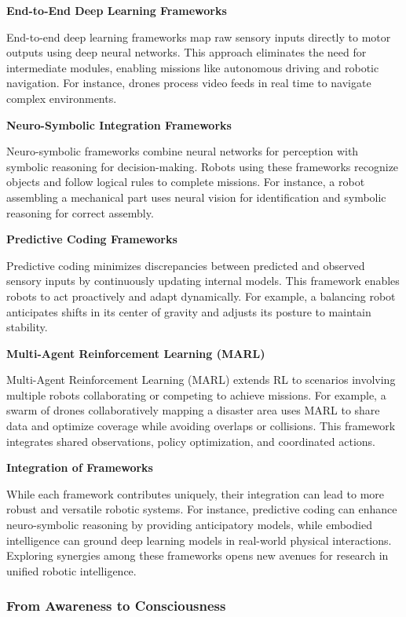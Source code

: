 \documentclass{book}
\providecommand{\ProjectDeepHeading}[2]{%
    \par\medskip\noindent\textbf{#2}\par\smallskip
}
\begin{document}
    \ProjectDeepHeading{4}{End-to-End Deep Learning Frameworks}
    End-to-end deep learning frameworks map raw sensory inputs directly to motor outputs using deep neural networks. This approach eliminates the need for intermediate modules, enabling missions like autonomous driving and robotic navigation. For instance, drones process video feeds in real time to navigate complex environments.

    \ProjectDeepHeading{4}{Neuro-Symbolic Integration Frameworks}
    Neuro-symbolic frameworks combine neural networks for perception with symbolic reasoning for decision-making. Robots using these frameworks recognize objects and follow logical rules to complete missions. For instance, a robot assembling a mechanical part uses neural vision for identification and symbolic reasoning for correct assembly.

    \ProjectDeepHeading{4}{Predictive Coding Frameworks}
    Predictive coding minimizes discrepancies between predicted and observed sensory inputs by continuously updating internal models. This framework enables robots to act proactively and adapt dynamically. For example, a balancing robot anticipates shifts in its center of gravity and adjusts its posture to maintain stability. 

    \ProjectDeepHeading{4}{Multi-Agent Reinforcement Learning (MARL)}
    Multi-Agent Reinforcement Learning (MARL) extends RL to scenarios involving multiple robots collaborating or competing to achieve missions. For example, a swarm of drones collaboratively mapping a disaster area uses MARL to share data and optimize coverage while avoiding overlaps or collisions. This framework integrates shared observations, policy optimization, and coordinated actions.

    \ProjectDeepHeading{4}{Integration of Frameworks}
    While each framework contributes uniquely, their integration can lead to more robust and versatile robotic systems. For instance, predictive coding can enhance neuro-symbolic reasoning by providing anticipatory models, while embodied intelligence can ground deep learning models in real-world physical interactions. Exploring synergies among these frameworks opens new avenues for research in unified robotic intelligence.


\subsubsection{From Awareness to Consciousness}
\end{document}
